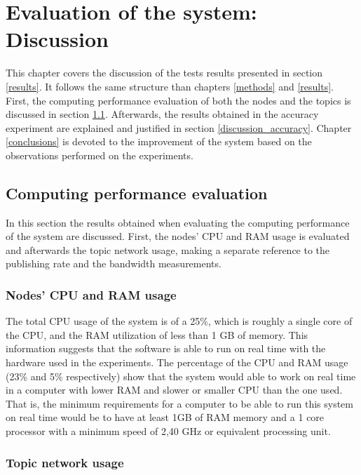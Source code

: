 \chapter{Evaluation of the system: Discussion}
\label{discussion}

This chapter covers the discussion of the tests results presented in section \ref{results}.
It follows the same structure than chapters \ref{methods} and \ref{results}. 
First, the computing performance evaluation of both the nodes and the topics is discussed in section \ref{discussion_computing}. 
Afterwards, the results obtained in the accuracy experiment are explained and justified in section \ref{discussion_accuracy}. 
Chapter \ref{conclusions} is devoted to the improvement of the system based on the observations performed on the experiments. 

\section{Computing performance evaluation}
\label{discussion_computing}
In this section the results obtained when evaluating the computing performance of the system are discussed. 
First, the nodes' CPU and RAM usage is evaluated and afterwards the topic network usage, making a separate reference to the publishing rate and the bandwidth measurements. 

	\subsection{Nodes' CPU and RAM usage}

			The total CPU usage of the system is of a 25\%, which is roughly a single core of the CPU, and the RAM utilization of less than 1 GB of memory. 
			This information suggests that the software is able to run on real time with the hardware used in the experiments. 
			The percentage of the CPU and RAM usage (23\% and 5\% respectively) show that the system would able to work on real time in a computer with lower RAM and slower or smaller CPU than the one used. 
			That is, the minimum requirements for a computer to be able to run this system on real time would be to have at least 1GB of RAM memory and a 1 core processor with a minimum speed of 2,40 GHz or equivalent processing unit.  


		\subsection{Topic network usage}

